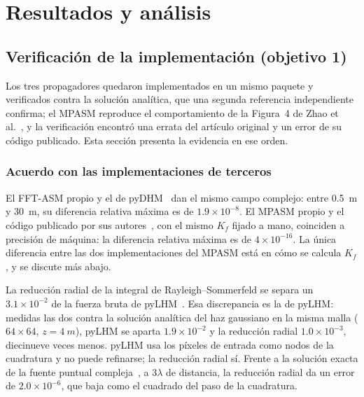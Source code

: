\chapter{Resultados y análisis}
\label{cap:resultados}

\section{Verificación de la implementación (objetivo 1)}
\label{sec:res-obj1}


Los tres propagadores quedaron implementados en un mismo paquete y verificados
contra la solución analítica, que una segunda referencia independiente
confirma; el MPASM reproduce el comportamiento de la Figura~4 de Zhao et
al.~\cite{zhao2020}, y la verificación encontró una errata del artículo
original y un error de su código publicado. Esta sección presenta la evidencia en ese orden.

\subsection{Acuerdo con las implementaciones de terceros}

El FFT-ASM propio y el de pyDHM~\cite{castaneda2022} dan el mismo campo
complejo: entre \SI{0.5}{m} y \SI{30}{m}, su diferencia relativa máxima es
de $1.9\times10^{-8}$. El MPASM propio y el código publicado por sus
autores~\cite{zhao2020code}, con el mismo $K_f$ fijado a mano, coinciden a
precisión de máquina: la diferencia relativa máxima es de
$4\times10^{-16}$. La única diferencia entre las dos implementaciones del
MPASM está en cómo se calcula $K_f$, y se discute más abajo.

La reducción radial de la integral de Rayleigh--Sommerfeld se separa un
$3.1\times10^{-2}$ de la fuerza bruta de pyLHM~\cite{pylhm}. Esa discrepancia
es la de pyLHM: medidas las dos contra la solución analítica del haz gaussiano
en la misma malla ($64\times64$, $z = \SI{4}{m}$), pyLHM se aparta
$1.9\times10^{-2}$ y la reducción radial $1.0\times10^{-3}$, diecinueve veces
menos. pyLHM usa los píxeles de entrada como nodos de la cuadratura y no puede
refinarse; la reducción radial sí. Frente a la solución exacta de la fuente
puntual compleja~\cite{deschamps1971}, a $3\lambda$ de distancia, la reducción
radial da un error de $2.0\times10^{-6}$, que baja como el cuadrado del paso de
la cuadratura.

